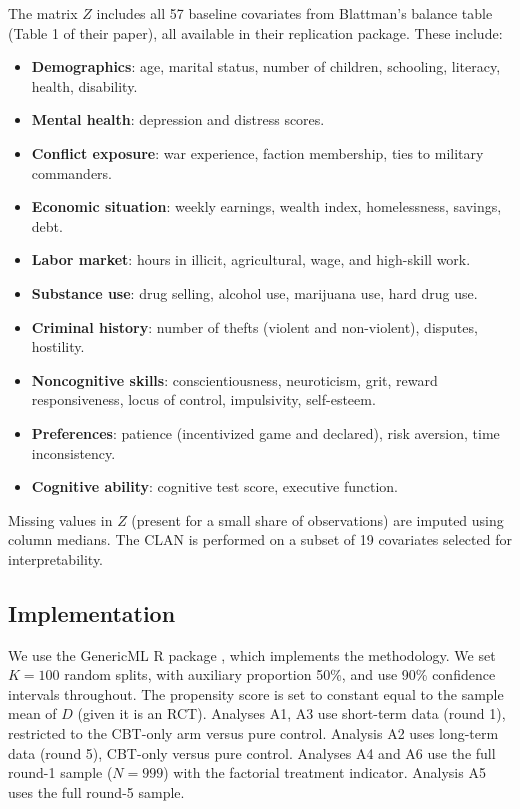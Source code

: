 \documentclass[11pt]{article}
\begin{document}
The matrix $Z$ includes all 57 baseline covariates from Blattman's
balance table (Table 1 of their paper), all available in their replication package. These include:

\begin{itemize}
\item \textbf{Demographics}: age, marital status, number of children,
  schooling, literacy, health, disability.
\item \textbf{Mental health}: depression and distress scores.
\item \textbf{Conflict exposure}: war experience, faction membership,
  ties to military commanders.
\item \textbf{Economic situation}: weekly earnings, wealth index,
  homelessness, savings, debt.
\item \textbf{Labor market}: hours in illicit, agricultural, wage, and
  high-skill work.
\item \textbf{Substance use}: drug selling, alcohol use, marijuana use,
  hard drug use.
\item \textbf{Criminal history}: number of thefts (violent and non-violent),
  disputes, hostility.
\item \textbf{Noncognitive skills}: conscientiousness, neuroticism, grit,
  reward responsiveness, locus of control, impulsivity, self-esteem.
\item \textbf{Preferences}: patience (incentivized game and declared),
  risk aversion, time inconsistency.
\item \textbf{Cognitive ability}: cognitive test score, executive function.
\end{itemize}

Missing values in $Z$ (present for a small share of observations) are imputed
using column medians. The CLAN is performed on a subset of 19 covariates
selected for interpretability.

\subsection{Implementation}

We use the GenericML R package \citep{welz2022}, which implements the
\citet{chernozhukov2025} methodology. We set $K=100$ random splits, with
auxiliary proportion 50\%, and use 90\% confidence intervals throughout. The propensity score is set to constant equal to the sample mean of $D$ (given it is an RCT). Analyses A1, A3 use
short-term data (round 1), restricted to the CBT-only arm versus pure control. Analysis A2 uses long-term data (round 5), CBT-only versus pure control. Analyses A4 and A6 use the full round-1 sample ($N= 999$) with the factorial treatment indicator. Analysis A5 uses the full round-5 sample.
\end{document}
